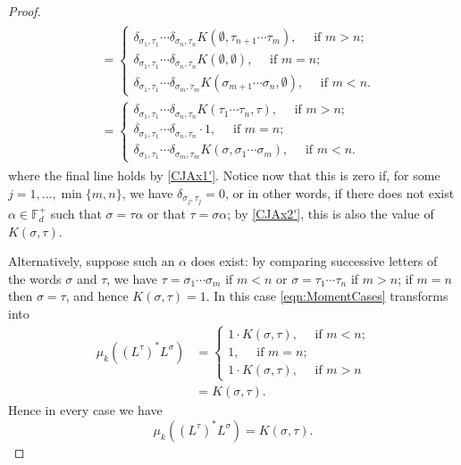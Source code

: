 \documentclass[11pt,reqno]{amsart}
\def\a{\alpha}
\def\s{\sigma}
\def\t{\tau}
\def\d{\delta}
\def\FF{\mathbb{F}}
\theoremstyle{definition}
\numberwithin{equation}{section}
\begin{document}
\begin{proof}
\begin{align}
\begin{split}
        & = \begin{cases} \d_{\s_1, \t_1} \cdots \d_{\s_n, \t_n} K(\emptyset, \t_{n+1}\cdots\t_m), \quad \text{ if \(m > n\);} \\ \d_{\s_1, \t_1} \cdots \d_{\s_n, \t_n} K(\emptyset,\emptyset), \quad \text{ if \(m = n\);} \\ \d_{\s_1, \t_1} \cdots \d_{\s_m, \t_m} K(\s_{m+1}\cdots\s_n, \emptyset), \quad \text{ if \(m < n\).}\end{cases} \\
        & = \begin{cases} \d_{\s_1, \t_1} \cdots \d_{\s_n, \t_n} K(\t_1\cdots \t_n, \t), \quad \text{ if \(m > n\);} \\ \d_{\s_1, \t_1} \cdots \d_{\s_n, \t_n}\cdot 1, \quad \text{ if \(m = n\);} \\ \d_{\s_1, \t_1} \cdots \d_{\s_m, \t_m} K(\s, \s_1\cdots\s_m), \quad \text{ if \(m < n\).}\end{cases}
        \end{split}
    \end{align}
    where the final line holds by \eqref{CJAx1'}. Notice now that this is zero if, for some \(j = 1, \ldots, \min\{m,n\}\), we have \(\d_{\s_j, \t_j} = 0\), or in other words, if there does not exist \(\a \in \FF_d^+\) such that \(\s =  \t\a\) or that \(\t = \s\a\); by \eqref{CJAx2'}, this is also the value of \(K(\s,\t)\).
    
    Alternatively, suppose such an \(\a\) does exist: by comparing successive letters of the words \(\s\) and \(\t\), we have \(\t = \s_1 \cdots \s_m\) if \(m < n\) or \(\s = \t_1 \cdots \t_n\) if \(m > n\); if \(m = n\) then \(\s = \t\), and hence \(K(\s,\t) = 1\). In this case \eqref{eqn:MomentCases} transforms into
    \begin{align*}
        \mu_k((L^\t)^* L^\s) & = \begin{cases} 1 \cdot K(\s, \t), \quad \text{ if \(m < n\);} \\ 1, \quad \text{ if \(m = n\);} \\ 1 \cdot K(\s, \t), \quad \text{ if \(m > n\)}\end{cases} \\
        & = K(\s,\t).
    \end{align*}
   Hence in every case we have
    \[
        \mu_k((L^\t)^* L^\s) = K(\s,\t).
    \]
    

\end{proof}
\end{document}
